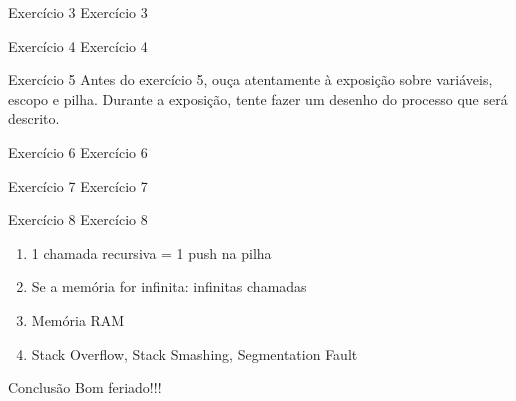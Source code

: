 \documentclass{beamer}
\begin{document}
\begin{frame}[fragile]{Exercício 3}
  \centering
  \Large
  Exercício 3
\end{frame}

\begin{frame}[fragile]{Exercício 4}
  \centering
  \Large
  Exercício 4
\end{frame}

\begin{frame}[fragile]{Exercício 5}
  \centering
  \Large
  Antes do exercício 5, ouça atentamente à exposição sobre variáveis, escopo e
  pilha. Durante a exposição, tente fazer um desenho do processo que será
  descrito.
\end{frame}

\begin{frame}[fragile]{Exercício 6}
  \centering
  \Large
  Exercício 6
\end{frame}

\begin{frame}[fragile]{Exercício 7}
  \centering
  \Large
  Exercício 7
\end{frame}

\begin{frame}[fragile]{Exercício 8}
  \centering
  \Large
  Exercício 8
  \begin{enumerate}
    \item <2-> 1 chamada recursiva = 1 push na pilha
    \item <3-> Se a memória for infinita: infinitas chamadas
    \item <4-> Memória RAM
    \item <5-> Stack Overflow, Stack Smashing, Segmentation Fault
  \end{enumerate}
\end{frame}

\begin{frame}[fragile]{Conclusão}
  \centering
  \LARGE
  Bom feriado!!!
\end{frame}
\end{document}
